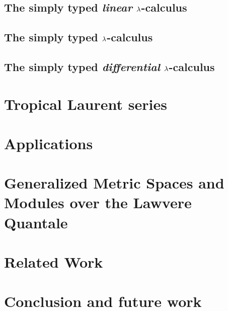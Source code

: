 \documentclass[conference]{IEEEtran}
\begin{document}
\subsection{The simply typed \emph{linear} $\lambda$-calculus}


\subsection{The simply typed $\lambda$-calculus}
%

\subsection{The simply typed \emph{differential} $\lambda$-calculus}
%


\section{Tropical Laurent series}
%


\section{Applications}
%


\section{Generalized Metric Spaces and Modules over the Lawvere Quantale}\label{sec:QMod}
%


\section{Related Work}



\section{Conclusion and future work}\label{sec:concl}

\end{document}
